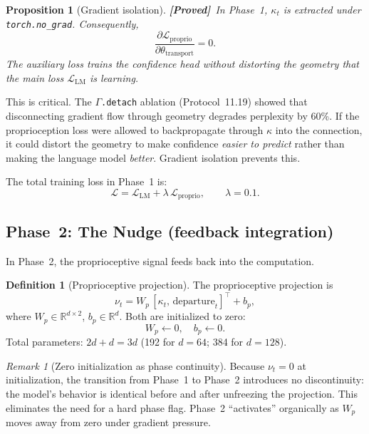 \documentclass[11pt,a4paper]{article}
\newtheorem{proposition}[theorem]{Proposition}
\theoremstyle{definition}
\newtheorem{definition}[theorem]{Definition}
\theoremstyle{remark}
\newtheorem{remark}[theorem]{Remark}
\newcommand{\statusproved}{\textcolor{green!50!black}{\textbf{[Proved]}}}
\begin{document}
\begin{proposition}[Gradient isolation]\label{prop:gradient_isolation}
\statusproved\ In Phase~1, $\kappa_t$ is extracted under 
\texttt{torch.no\_grad}. Consequently,
\[
    \frac{\partial \mathcal{L}_{\mathrm{proprio}}}
    {\partial \theta_{\mathrm{transport}}} = 0.
\]
The auxiliary loss trains the confidence head without distorting 
the geometry that the main loss $\mathcal{L}_{\mathrm{LM}}$ is 
learning.
\end{proposition}

This is critical. The $\Gamma$\texttt{.detach} ablation 
(Protocol~11.19) showed that disconnecting gradient flow through 
geometry degrades perplexity by 60\%. If the proprioception loss 
were allowed to backpropagate through $\kappa$ into the connection, 
it could distort the geometry to make confidence \emph{easier to 
predict} rather than making the language model \emph{better}. 
Gradient isolation prevents this.

The total training loss in Phase~1 is:
\begin{equation}\label{eq:phase1_loss}
    \mathcal{L} = \mathcal{L}_{\mathrm{LM}} + \lambda\,
    \mathcal{L}_{\mathrm{proprio}}, \qquad \lambda = 0.1.
\end{equation}

\subsection{Phase~2: The Nudge (feedback integration)}
\label{sec:proprio_phase2}

In Phase~2, the proprioceptive signal feeds back into the 
computation.

\begin{definition}[Proprioceptive projection]\label{def:proprio_proj}
The proprioceptive projection is
\[
    \nu_t = W_p\,[\kappa_t,\,\mathrm{departure}_t]^\top + b_p,
\]
where $W_p \in \mathbb{R}^{d \times 2}$, $b_p \in \mathbb{R}^d$. 
Both are initialized to zero:
\[
    W_p \leftarrow 0, \quad b_p \leftarrow 0.
\]
Total parameters: $2d + d = 3d$ (192 for $d = 64$; 384 for $d = 128$).
\end{definition}

\begin{remark}[Zero initialization as phase continuity]
\label{rem:zero_init}
Because $\nu_t = 0$ at initialization, the transition from Phase~1 to 
Phase~2 introduces no discontinuity: the model's behavior is identical 
before and after unfreezing the projection. This eliminates the need 
for a hard phase flag. Phase~2 ``activates'' organically as 
$W_p$ moves away from zero under gradient pressure.
\end{remark}
\end{document}
